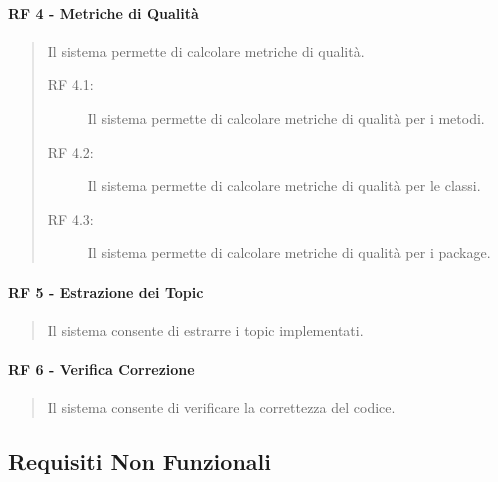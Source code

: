 		
		\paragraph{RF 4 - Metriche di Qualità} 
		\begin{quote}Il sistema permette di calcolare metriche di qualità.
			\begin{description}
				\item [RF 4.1:] Il sistema permette di calcolare metriche di qualità per i metodi.
				\item [RF 4.2:] Il sistema permette di calcolare metriche di qualità per le classi.
				\item [RF 4.3:] Il sistema permette di calcolare metriche di qualità per i package.
			\end{description}
		\end{quote}
		
		\paragraph{RF 5 - Estrazione dei Topic} 
		\begin{quote}Il sistema consente di estrarre i topic implementati.
		\end{quote}
	
		\paragraph{RF 6 - Verifica Correzione}
		\begin{quote}Il sistema consente di verificare la correttezza del codice.
		\end{quote}  
	
			
	\subsection{Requisiti Non Funzionali}
	
